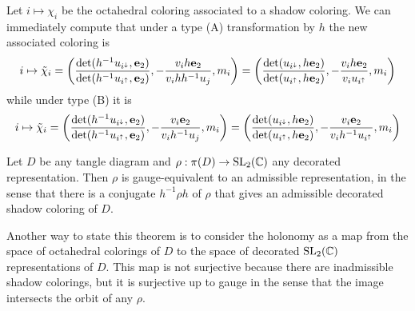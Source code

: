 \documentclass[leqno]{sl2art}
\begin{document}
Let \(i \mapsto \chi_i\) be the octahedral coloring associated to a shadow coloring.
We can immediately compute that under a type (A) transformation by \(h\) the new associated coloring is
\begin{equation}
  \label{eq:type-A-gauge}
  i \mapsto
  \tilde{\chi}_i
  =
  \left(
    \frac{
      \det( h^{-1} u_{i^{\downarrow}} , \mathrm{\mathbf{e}}_{2} )
    }{
      \det( h^{-1} u_{i^{\uparrow}} , \mathrm{\mathbf{e}}_{2} )
    }
    ,
    -
    \frac{
      v_i h \mathrm{\mathbf{e}}_{2}
    }{
      v_i h h^{-1} u_j
    }
    ,
    m_i
  \right)
  =
  \left(
    \frac{
      \det( u_{i^{\downarrow}} , h \mathrm{\mathbf{e}}_{2} )
    }{
      \det( u_{i^{\uparrow}} , h \mathrm{\mathbf{e}}_{2} )
    }
    ,
    -
    \frac{
      v_i h \mathrm{\mathbf{e}}_{2}
    }{
      v_i u_{i^{\uparrow}}
    }
    ,
    m_i
  \right)
\end{equation}
while under type (B) it is
\begin{equation}
  \label{eq:type-B-gauge}
  i \mapsto
  \tilde{\chi}_i
  =
  \left(
    \frac{
      \det( h^{-1} u_{i^{\downarrow}} , \mathrm{\mathbf{e}}_{2} )
    }{
      \det( h^{-1} u_{i^{\uparrow}} , \mathrm{\mathbf{e}}_{2} )
    }
    ,
    -
    \frac{
      v_i \mathrm{\mathbf{e}}_{2}
    }{
      v_i  h^{-1} u_j 
    }
    ,
    m_i
  \right)
  =
  \left(
    \frac{
      \det( u_{i^{\downarrow}} , h \mathrm{\mathbf{e}}_{2} )
    }{
      \det( u_{i^{\uparrow}} , h \mathrm{\mathbf{e}}_{2} )
    }
    ,
    -
    \frac{
      v_i \mathrm{\mathbf{e}}_{2}
    }{
      v_i  h^{-1} u_{i^{\uparrow}}
    }
    ,
    m_i
  \right)
\end{equation}


\begin{bigtheorem}
  \label{thm:gauge-equivalent-to-admissible}
  Let \(D\) be any tangle diagram and \(\rho : \pi(D) \to \operatorname{SL}_2(\mathbb{C})\) any decorated representation.
  Then \(\rho\) is gauge-equivalent to an admissible representation, in the sense that there is a conjugate \(h^{-1} \rho h\) of \(\rho\) that gives an admissible decorated shadow coloring of \(D\).
\end{bigtheorem}

Another way to state this theorem is to consider the holonomy as a map from the space of octahedral colorings of \(D\) to the space of decorated \(\operatorname{SL}_2(\mathbb{C})\) representations of \(D\).
This map is not surjective because there are inadmissible shadow colorings, but it is surjective up to gauge in the sense that the image intersects the orbit of any \(\rho\).
\end{document}
